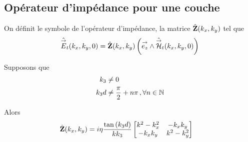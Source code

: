 




    \subsection{Opérateur d'impédance pour une couche}

        \begin{defn}
            On définit le symbole de l'opérateur d'impédance, la matrice \(\hat {\mathbf{Z}}(k_x,k_y)\) tel que
            \begin{equation}
                \hat {{\overset{\rightarrow}{E}}}_t(k_x,k_y,0) = \hat {\mathbf{Z}}(k_x,k_y) \left({\overset{\rightarrow}{e_z}} \wedge \hat {{\overset{\rightarrow}{\mathcal{H}}}}_t(k_x,k_y,0)\right)
            \end{equation}
        \end{defn}

        \begin{thm}
            Supposons que
            \begin{subequations}
                \label{eq:imp_fourier:plan:hyp_1_c}
                \begin{align}
                    k_3     & \not =0 \\
                    k_3d    & \not = \dfrac{\pi}{2}+n\pi\,, \forall n \in \mathbb N
                \end{align}
            \end{subequations}

            Alors
            \begin{align}
            \label{eq:imp_plan:symb_z:1c}
            \hat {\mathbf{Z}}(k_x,k_y) &= i\eta\dfrac{\tan\left(k_3d\right)}{kk_3}
                \begin{bmatrix}
                   k^2-k_x^2  & -k_xk_y\\
                    -k_xk_y & k^2-k_y^2\\
                \end{bmatrix}
            \end{align}
        \end{thm}

